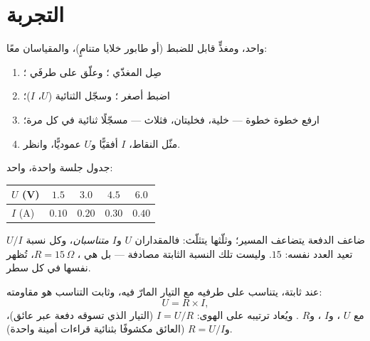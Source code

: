 \section{التجربة}

\begin{method}\label{met:g8:ohms-law:portrait}
 واحد، ومغذٍّ قابل للضبط (أو طابور خلايا متنامٍ)،
والمقياسان معًا:
\begin{enumerate}
  \item صِل المغذّي   ؛ وعلّق
         على طرفَي ؛
  \item اضبط أصغر ؛ وسجّل الثنائية ($U$، $I$)؛
  \item ارفع  خطوة خطوة --- خلية، فخليتان، فثلاث ---
        مسجّلًا ثنائية في كل مرة؛
  \item مثّل النقاط، $I$ أفقيًّا و$U$ عموديًّا، وانظر.
\end{enumerate}
\end{method}

\begin{example}\label{ex:g8:ohms-law:confession}
جدول جلسة واحدة،  واحد:
\begin{center}
\begin{tabular}{l|cccc}
$U$ (\unit{V}) & $1.5$ & $3.0$ & $4.5$ & $6.0$ \\
\hline
$I$ (\unit{A}) & $0.10$ & $0.20$ & $0.30$ & $0.40$
\end{tabular}
\end{center}
ضاعف الدفعة يتضاعف المسير؛ وثلّثها يتثلّث: فالمقداران $U$
و$I$ \emph{متناسبان}، وكل نسبة $U/I$ تعيد العدد نفسه: $15$. وليست
تلك النسبة الثابتة مصادفة --- بل هي  ،
$R = 15\,\Omega$، تُظهر نفسها في كل سطر.
\end{example}

\begin{proposition}\label{prop:g8:ohms-law:law}
 عند  ثابتة، يتناسب  على طرفيه مع التيار
المارّ فيه، وثابت التناسب هو مقاومته:
\[
U = R \times I ,
\]
مع $U$ ، و$I$ ، و$R$ . ويُعاد ترتيبه على
الهوى: $I = U/R$ (التيار الذي تسوقه دفعة عبر عائق)،
و$R = U/I$ (العائق مكشوفًا بثنائية قراءات أمينة واحدة).
\end{proposition}

